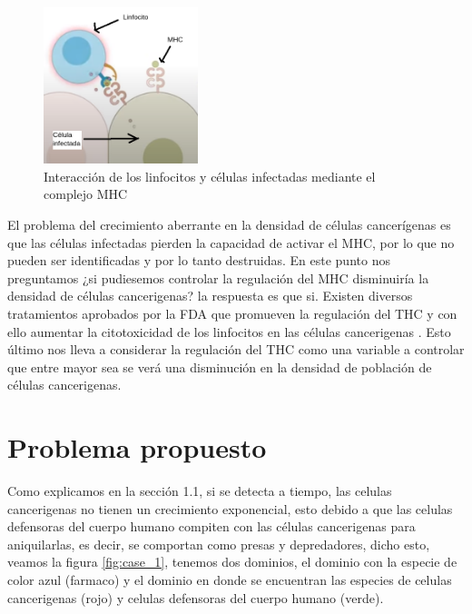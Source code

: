 \documentclass{article}
\begin{document}
\begin{figure}[ht]
    \centering
    \includegraphics[width=0.4\textwidth]{images/mhc.png}
    \caption{Interacción de los linfocitos y células infectadas mediante el complejo MHC}
    \label{fig:mhc}
\end{figure}

El problema del crecimiento aberrante en la densidad de células cancerígenas es que las células infectadas pierden la capacidad de activar el MHC, por lo que no pueden ser identificadas y por lo tanto destruidas. En este punto nos preguntamos ¿si pudiesemos controlar la regulación del MHC disminuiría la densidad de células cancerigenas? la respuesta es que si. Existen diversos tratamientos aprobados por la FDA que promueven la regulación del THC y con ello aumentar la citotoxicidad de los linfocitos en las células cancerigenas \cite{Cornel072020}. Esto último nos lleva a considerar la regulación del THC como una variable a controlar que entre mayor sea se verá una disminución en la densidad de población de células cancerigenas.


 \newpage
\section{Problema propuesto}
Como explicamos en la sección 1.1, si se detecta a tiempo, las celulas cancerigenas no tienen un crecimiento exponencial, esto debido a que las celulas defensoras del cuerpo humano compiten con las células cancerigenas para aniquilarlas, es decir, se comportan como presas y depredadores, dicho esto, veamos la figura \ref{fig:case_1}, tenemos dos dominios, el dominio con la especie de color azul (farmaco) y el dominio en donde se encuentran las especies de celulas cancerigenas (rojo) y celulas defensoras del cuerpo humano (verde).
\end{document}
